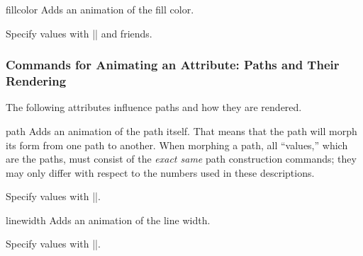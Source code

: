 \begin{sysanimateattribute}{fillcolor}
  Adds an animation of the fill color.
  
  Specify values with |\pgfsys@animation@val@color@rgb| and friends.
\begin{codeexample}[width=2cm]
\end{codeexample}
\end{sysanimateattribute}


\subsubsection{Commands for Animating an Attribute: Paths and Their Rendering}

The following attributes influence paths and how they are rendered.

\begin{sysanimateattribute}{path}
  Adds an animation of the path itself. That means that the path will
  morph its form from one path to another. When morphing a path, all
  ``values,'' which are the paths, must consist of the  \emph{exact
    same} path construction commands; they may only differ with
  respect to the numbers used in these descriptions.
  
  Specify values with |\pgfsys@animation@val@path|.
\begin{codeexample}[width=3.3cm]
\end{codeexample}
\end{sysanimateattribute}

\begin{sysanimateattribute}{linewidth}
  Adds an animation of the line width.
  
  Specify values with |\pgfsys@animation@val@dimension|.
\begin{codeexample}[width=2cm]
\end{codeexample}
\end{sysanimateattribute}

